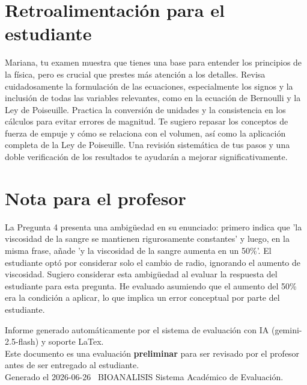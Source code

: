 \documentclass[11pt,a4paper]{article}
\begin{document}
\section*{Retroalimentación para el estudiante}
\begin{tcolorbox}[cajaRecomendacion, title={Dirigido a: mariana salazar 33570679}]
Mariana, tu examen muestra que tienes una base para entender los principios de la física, pero es crucial que prestes más atención a los detalles. Revisa cuidadosamente la formulación de las ecuaciones, especialmente los signos y la inclusión de todas las variables relevantes, como en la ecuación de Bernoulli y la Ley de Poiseuille. Practica la conversión de unidades y la consistencia en los cálculos para evitar errores de magnitud. Te sugiero repasar los conceptos de fuerza de empuje y cómo se relaciona con el volumen, así como la aplicación completa de la Ley de Poiseuille. Una revisión sistemática de tus pasos y una doble verificación de los resultados te ayudarán a mejorar significativamente.
\end{tcolorbox}

\section*{Nota para el profesor}
\begin{tcolorbox}[
  enhanced, breakable,
  colback=yellow!8, colframe=yellow!60!black,
  fonttitle=\bfseries, coltitle=black,
  title={Observaciones para revisión manual},
  top=4pt, bottom=4pt, left=8pt, right=8pt,
]
La Pregunta 4 presenta una ambigüedad en su enunciado: primero indica que 'la viscosidad de la sangre se mantienen rigurosamente constantes' y luego, en la misma frase, añade 'y la viscosidad de la sangre aumenta en un 50\%'. El estudiante optó por considerar solo el cambio de radio, ignorando el aumento de viscosidad. Sugiero considerar esta ambigüedad al evaluar la respuesta del estudiante para esta pregunta. He evaluado asumiendo que el aumento del 50\% era la condición a aplicar, lo que implica un error conceptual por parte del estudiante.
\end{tcolorbox}

\vspace{12pt}
\begin{center}
  \footnotesize\color{gray}
  Informe generado automáticamente por el sistema de evaluación con IA (gemini-2.5-flash) y soporte LaTex. \\
  Este documento es una evaluación \textbf{preliminar} para ser revisado por el profesor antes de ser entregado al 
  estudiante. \\
  Generado el 2026-06-26 \textbullet\ BIOANALISIS Sistema Académico de Evaluación.
  \end{center}
\end{document}
